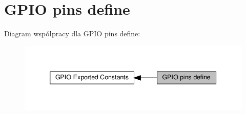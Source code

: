 \hypertarget{group___g_p_i_o__pins__define}{}\section{G\+P\+IO pins define}
\label{group___g_p_i_o__pins__define}
Diagram współpracy dla G\+P\+IO pins define\+:\nopagebreak
\begin{figure}[H]
\begin{center}
\leavevmode
\includegraphics[width=339pt]{group___g_p_i_o__pins__define}
\end{center}
\end{figure}
